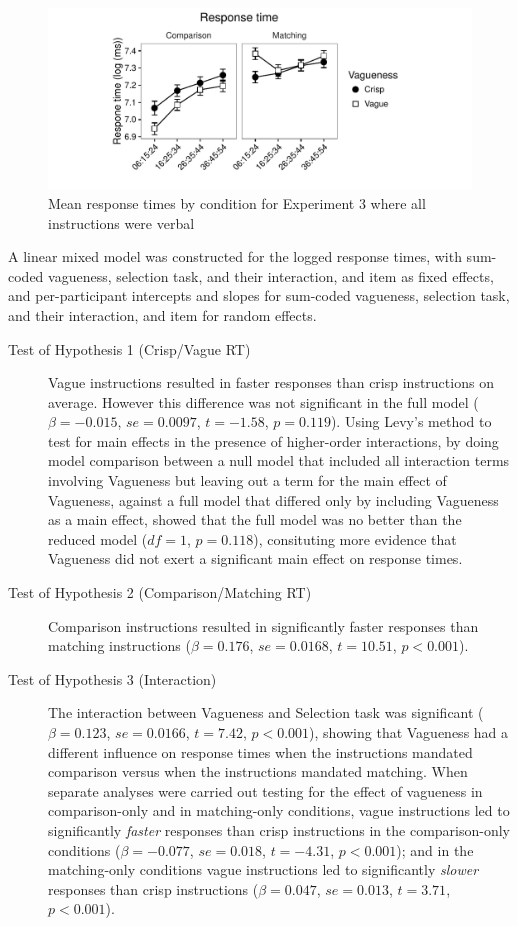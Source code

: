 \begin{figure}[htbp]
\centering
\includegraphics[width=\textwidth]{figures/Ee3-rtplot-1.pdf}
\caption{Mean response times by condition for Experiment 3 where all instructions were verbal}
\label{resultsE-exp-3}
\end{figure}

A linear mixed model was constructed for the logged response times, with sum-coded vagueness, selection task, and their interaction, and item as fixed effects, and per-participant intercepts and slopes for sum-coded vagueness, selection task, and their interaction, and item for random effects.

\begin{description}
	\item [Test of Hypothesis 1 (Crisp/Vague RT)] Vague instructions resulted in faster responses than crisp instructions on average. However this difference was not significant in the full model ($\beta=-0.015$, $se=0.0097$, $t=-1.58$, $p=0.119$). Using Levy's method \citep{Levy:MainEffectsInteractions} to test for main effects in the presence of higher-order interactions, by doing model comparison between a null model that included all interaction terms involving Vagueness but leaving out a term for the main effect of Vagueness, against a full model that differed only by including Vagueness as a main effect, showed that the full model was no better than the reduced model ($df=1$, $p=0.118$), consituting more evidence that Vagueness did not exert a significant main effect on response times. 
	\item [Test of Hypothesis 2 (Comparison/Matching RT)] Comparison instructions resulted in significantly faster responses than matching instructions ($\beta=0.176$, $se=0.0168$, $t=10.51$, $p<0.001$).
	\item [Test of Hypothesis 3 (Interaction)] The interaction between Vagueness and Selection task was significant ($\beta=0.123$, $se=0.0166$, $t=7.42$, $p<0.001$), showing that Vagueness had a different influence on response times when the instructions mandated comparison versus when the instructions mandated matching. When separate analyses were carried out testing for the effect of vagueness in comparison-only and in matching-only conditions, vague instructions led to significantly \emph{faster} responses than crisp instructions in the comparison-only conditions ($\beta=-0.077$, $se=0.018$, $t=-4.31$, $p<0.001$); and in the matching-only conditions vague instructions led to significantly \emph{slower} responses than crisp instructions ($\beta=0.047$, $se=0.013$, $t=3.71$, $p<0.001$).
\end{description}


